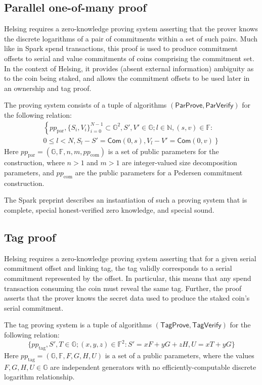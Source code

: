 \documentclass{article}
\newcommand{\G}{\mathbb{G}}
\newcommand{\F}{\mathbb{F}}
\newcommand{\func}[1]{\mathsf{#1}}
\newcommand{\com}{\func{Com}}
\theoremstyle{remark}
\begin{document}
\subsection{Parallel one-of-many proof}

Helsing requires a zero-knowledge proving system asserting that the prover knows the discrete logarithms of a pair of commitments within a set of such pairs.
Much like in Spark spend transactions, this proof is used to produce commitment offsets to serial and value commitments of coins comprising the commitment set.
In the context of Helsing, it provides (absent external information) ambiguity as to the coin being staked, and allows the commitment offsets to be used later in an ownership and tag proof.

The proving system consists of a tuple of algorithms $(\func{ParProve},\func{ParVerify})$ for the following relation:
\begin{multline*}
\left\{ pp_{\text{par}}, \{S_i,V_i\}_{i=0}^{N-1} \subset \G^2, S',V' \in \G ; l \in \mathbb{N}, (s,v) \in \F : \right. \\
\left. 0 \leq l < N, S_l - S' = \com(0,s), V_l - V' = \com(0,v) \right\}
\end{multline*}
Here $pp_{\text{par}} = (\G, \F, n, m, pp_{\text{com}})$ is a set of public parameters for the construction, where $n > 1$ and $m > 1$ are integer-valued size decomposition parameters, and $pp_{\text{com}}$ are the public parameters for a Pedersen commitment construction.

The Spark preprint describes an instantiation of such a proving system that is complete, special honest-verified zero knowledge, and special sound.


\subsection{Tag proof}

Helsing requires a zero-knowledge proving system asserting that for a given serial commitment offset and linking tag, the tag validly corresponds to a serial commitment represented by the offset.
In particular, this means that any spend transaction consuming the coin must reveal the same tag.
Further, the proof asserts that the prover knows the secret data used to produce the staked coin's serial commitment.

The tag proving system is a tuple of algorithms $(\func{TagProve},\func{TagVerify})$ for the following relation:
$$\{pp_{\text{tag}},S',T \in \G ; (x,y,z) \in \F^2 : S' = xF + yG + zH, U = xT + yG\}$$
Here $pp_{\text{tag}} = (\G,\F,F,G,H,U)$ is a set of a public parameters, where the values $F,G,H,U \in \G$ are independent generators with no efficiently-computable discrete logarithm relationship.
\end{document}
